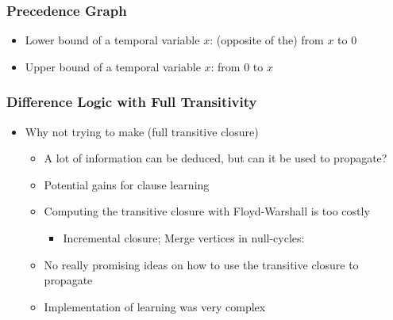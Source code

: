 \begin{frame}
\frametitle{Precedence Graph}

  \begin{center}
    \begin{colorschedfigure}{.6}
      \uncover<1>{
        
      }
    \end{colorschedfigure}
  \end{center}

  \begin{itemize}
    \item Lower bound of a temporal variable $x$: (opposite of the)  from $x$ to $0$

\vfill
    \item Upper bound of a temporal variable $x$:  from $0$ to $x$
  \end{itemize}

\end{frame}



\begin{frame}
\frametitle{Difference Logic with Full Transitivity}

\vfill
\begin{itemize}
  \item Why not trying to make  (full transitive closure)
  \vfill
  \begin{itemize}
    \item A lot of information can be deduced, but can it be used to propagate?

    \vfill
    \item Potential gains for clause learning
  \end{itemize}


  \vfill
  \begin{itemize}
    \item Computing the transitive closure with Floyd-Warshall is too costly

    \vfill
    \begin{itemize}
      \item Incremental closure; Merge vertices in null-cycles: 
    \end{itemize}

    \vfill
    \item No really promising ideas on how to use the transitive closure to propagate

    \vfill
    \item Implementation of learning was very complex
  \end{itemize}

\end{itemize}

\vfill
\end{frame}

